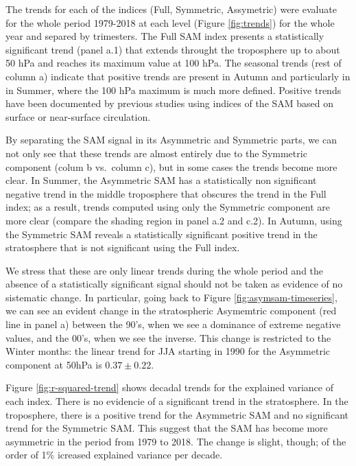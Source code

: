 \documentclass[twocol]{ametsocV5}
\begin{document}
The trends for each of the indices (Full, Symmetric, Assymetric) were
evaluate for the whole period 1979-2018 at each level (Figure
\ref{fig:trends}) for the whole year and separed by trimesters. The Full
SAM index presents a statistically significant trend (panel a.1) that
extends throught the troposphere up to about 50 hPa and reaches its
maximum value at 100 hPa. The seasonal trends (rest of column a)
indicate that positive trends are present in Autumn and particularly in
in Summer, where the 100 hPa maximum is much more defined. Positive
trends have been documented by previous studies \citep[e.g.][ and
references therein]{fogt2020} using indices of the SAM based on surface
or near-surface circulation.

By separating the SAM signal in its Asymmetric and Symmetric parts, we
can not only see that these trends are almost entirely due to the
Symmetric component (colum b vs.~column c), but in some cases the trends
become more clear. In Summer, the Asymmetric SAM has a statistically non
significant negative trend in the middle troposphere that obscures the
trend in the Full index; as a result, trends computed using only the
Symmetric component are more clear (compare the shading region in panel
a.2 and c.2). In Autumn, using the Symmetric SAM reveals a statistically
significant positive trend in the stratosphere that is not significant
using the Full index.

We stress that these are only linear trends during the whole period and
the absence of a statistically significant signal should not be taken as
evidence of no sistematic change. In particular, going back to Figure
\ref{fig:asymsam-timeseries}, we can see an evident change in the
stratospheric Asymemtric component (red line in panel a) between the
90's, when we see a dominance of extreme negative values, and the 00's,
when we see the inverse. This change is restricted to the Winter months:
the linear trend for JJA starting in 1990 for the Asymmetric component
at 50hPa is \(0.37 \pm 0.22\).

Figure \ref{fig:r-squared-trend} shows decadal trends for the explained
variance of each index. There is no evidencie of a significant trend in
the stratosphere. In the troposphere, there is a positive trend for the
Asymmetric SAM and no significant trend for the Symmetric SAM. This
suggest that the SAM has become more asymmetric in the period from 1979
to 2018. The change is slight, though; of the order of 1\% icreased
explained variance per decade.
\end{document}
